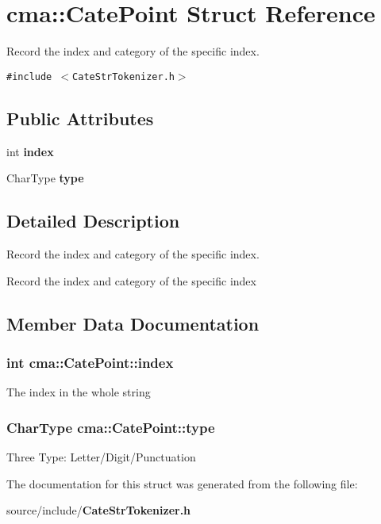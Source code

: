 \section{cma::CatePoint Struct Reference}
\label{structcma_1_1CatePoint}
Record the index and category of the specific index.  


{\tt \#include $<$CateStrTokenizer.h$>$}

\subsection*{Public Attributes}
\begin{CompactItemize}
\item 
int {\bf index}
\item 
CharType {\bf type}
\end{CompactItemize}


\subsection{Detailed Description}
Record the index and category of the specific index. 

Record the index and category of the specific index 

\subsection{Member Data Documentation}
\subsubsection[{index}]{\setlength{\rightskip}{0pt plus 5cm}int {\bf cma::CatePoint::index}}\label{structcma_1_1CatePoint_4d5fb8b0c7028e57ef179c0630f0eee7}


The index in the whole string 
\subsubsection[{type}]{\setlength{\rightskip}{0pt plus 5cm}CharType {\bf cma::CatePoint::type}}\label{structcma_1_1CatePoint_1eddb8c6760d5cd21d5f15b1ee8eb01f}


Three Type: Letter/Digit/Punctuation 

The documentation for this struct was generated from the following file:\begin{CompactItemize}
\item 
source/include/{\bf CateStrTokenizer.h}\end{CompactItemize}
